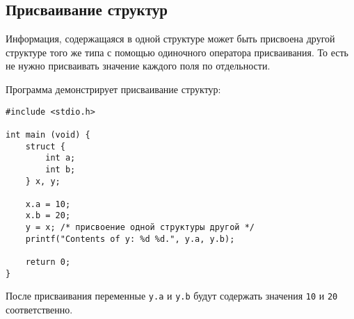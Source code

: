 \subsection{Присваивание структур}

Информация, содержащаяся в одной структуре может быть присвоена другой структуре того же типа с помощью одиночного оператора присваивания. То есть не нужно присваивать значение каждого поля по отдельности.

Программа демонстрирует присваивание структур:

\begin{verbatim}
#include <stdio.h> 

int main (void) { 
    struct { 
        int a;
        int b;
    } x, y;

    x.a = 10;
    x.b = 20;
    y = x; /* присвоение одной структуры другой */
    printf("Contents of y: %d %d.", y.a, y.b);

    return 0;
}
\end{verbatim}

После присваивания переменные \texttt{y.a} и \texttt{y.b} будут содержать значения \texttt{10} и \texttt{20} соответственно.
